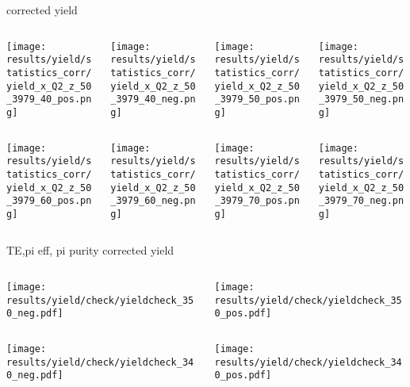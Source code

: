 \begin{frame}{corrected yield}
\begin{columns}
\begin{column}[T]{0.25\textwidth}
\texttt{[image: results/yield/statistics\_corr/yield\_x\_Q2\_z\_50\_3979\_40\_pos.png]}
\end{column}
\begin{column}[T]{0.25\textwidth}
\texttt{[image: results/yield/statistics\_corr/yield\_x\_Q2\_z\_50\_3979\_40\_neg.png]}
\end{column}
\begin{column}[T]{0.25\textwidth}
\texttt{[image: results/yield/statistics\_corr/yield\_x\_Q2\_z\_50\_3979\_50\_pos.png]}
\end{column}
\begin{column}[T]{0.25\textwidth}
\texttt{[image: results/yield/statistics\_corr/yield\_x\_Q2\_z\_50\_3979\_50\_neg.png]}
\end{column}
\end{columns}
\begin{columns}
\begin{column}[T]{0.25\textwidth}
\texttt{[image: results/yield/statistics\_corr/yield\_x\_Q2\_z\_50\_3979\_60\_pos.png]}
\end{column}
\begin{column}[T]{0.25\textwidth}
\texttt{[image: results/yield/statistics\_corr/yield\_x\_Q2\_z\_50\_3979\_60\_neg.png]}
\end{column}
\begin{column}[T]{0.25\textwidth}
\texttt{[image: results/yield/statistics\_corr/yield\_x\_Q2\_z\_50\_3979\_70\_pos.png]}
\end{column}
\begin{column}[T]{0.25\textwidth}
\texttt{[image: results/yield/statistics\_corr/yield\_x\_Q2\_z\_50\_3979\_70\_neg.png]}
\end{column}
\end{columns}
\end{frame}
\begin{frame}{TE,pi eff, pi purity corrected yield}
\begin{columns}
\begin{column}[T]{0.5\textwidth}
\texttt{[image: results/yield/check/yieldcheck\_350\_neg.pdf]}
\end{column}
\begin{column}[T]{0.5\textwidth}
\texttt{[image: results/yield/check/yieldcheck\_350\_pos.pdf]}
\end{column}
\end{columns}
\begin{columns}
\begin{column}[T]{0.5\textwidth}
\texttt{[image: results/yield/check/yieldcheck\_340\_neg.pdf]}
\end{column}
\begin{column}[T]{0.5\textwidth}
\texttt{[image: results/yield/check/yieldcheck\_340\_pos.pdf]}
\end{column}
\end{columns}
\end{frame}
